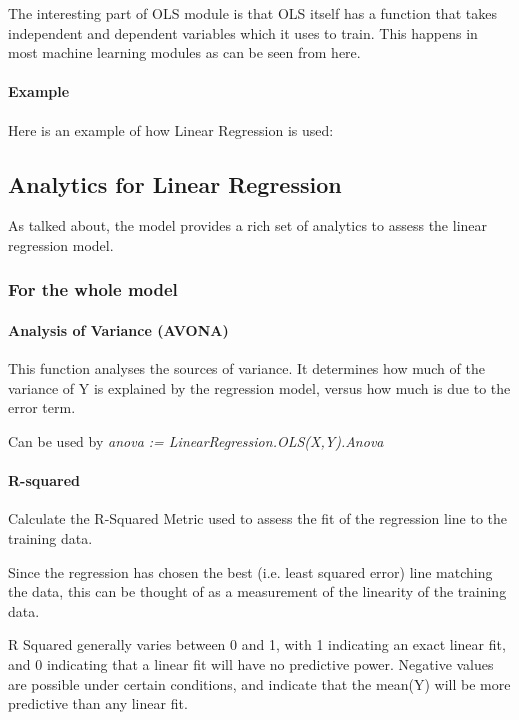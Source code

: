 The interesting part of OLS module is that OLS itself has a function that takes independent and dependent variables which it uses to train. This happens in most machine learning modules as can be seen from here.

\paragraph{Example}

Here is an example of how Linear Regression is used:



\subsection{Analytics for Linear Regression}

As talked about, the model provides a rich set of analytics to assess the linear regression model. 

\subsubsection{For the whole model}

\paragraph{Analysis of Variance (AVONA)}

This function analyses the sources of variance. It determines how much of the variance of Y is explained by the regression model, versus how much is due to the error term.

Can be used by \textit{anova := LinearRegression.OLS(X,Y).Anova}

\paragraph{R-squared}

Calculate the R-Squared Metric used to assess the fit of the regression line to the training data.

Since the regression has chosen the best (i.e. least squared error) line matching the data, this can be thought of as a measurement of the linearity of the training data.

R Squared generally varies between 0 and 1, with 1 indicating an exact linear fit, and 0 indicating that a linear fit will have no predictive power. Negative values are possible under certain conditions, and indicate that the mean(Y) will be more predictive than any linear fit.

